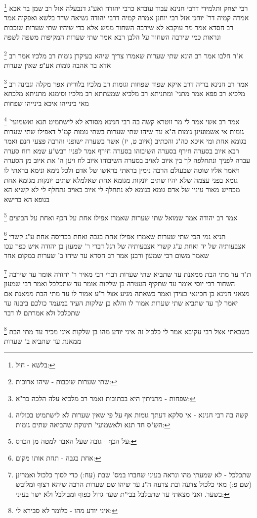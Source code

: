 \documentclass[12pt, openany]{book}
\newcommand{\footnotecomment}[1]{
	\renewcommand\thefootnote{}
	\footnote{#1}}
\newcommand{\commenta}[1]{\footnotecomment{#1}}
\begin{document}
{{\commenta{בלשא - חיל:}
רבי יצחק ותלמידי דרבי חנינא עבוד עובדא כרבי יהודה ואע"ג דנבעלה אזל רב שמן בר אבא אמרה קמיה דר' יוחנן אזל רבי יוחנן אמרה קמיה דרבי יהודה נשיאה שדר בלשא ואפקוה 
אמר רב חסדא אמר מר עוקבא לא שירבה השחור ממש אלא כדי שיהיו שתי שערות שוכבות ונראות כמי שירבה השחור על הלבן רבא אמר שתי שערות המקיפות משפה לשפה 
\commenta{שתי שערות שוכבות - שיהו ארוכות:}
א"ר חלבו אמר רב הונא שתי שערות שאמרו צריך שיהא בעיקרן גומות רב מלכיו אמר רב אדא בר אהבה גומות אע"פ שאין שערות 
\commenta{שפחות - מתניתין היא בכתובות ואמר רב מלכיא עלה הלכה כר"א:}
אמר רב חנינא בריה דרב איקא שפוד שפחות וגומות רב מלכיו בלורית אפר מקלה וגבינה רב מלכיא 
רב פפא אמר מתני' ומתניתא רב מלכיא שמעתתא רב מלכיו וסימנא מתניתא מלכתא 
מאי בינייהו איכא בינייהו שפחות 
\commenta{קשה בה רבי חנינא - אי סלקא דעתך גומות אף על פי שאין שערות לא לישתמיט בכוליה הש"ס חד תנא ולאשמועי' תינוקת שהביאה שתים גומות:}
אמר רב אשי אמר לי מר זוטרא קשה בה רבי חנינא מסורא לא לישתמיט תנא ואשמועי' גומות אי אשמועינן גומות ה"א עד שיהו שתי שערות בשתי גומות קמ"ל דאפילו שתי שערות בגומא אחת 
ומי איכא כה"ג והכתיב (איוב ט, יז) אשר בשערה ישופני והרבה פצעי חנם ואמר רבא איוב בסערה חירף בסערה השיבוהו בסערה חירף אמר לפניו רבש"ע שמא רוח סערה עברה לפניך ונתחלפה לך בין איוב לאויב בסערה השיבוהו {איוב לח } ויען ה' את
איוב מן הסערה ויאמר אליו שוטה שבעולם הרבה נימין בראתי בראשו של אדם ולכל נימא ונימא בראתי לו גומא בפני עצמה שלא יהיו שתים יונקות מגומא אחת שאלמלא שתים יונקות מגומא אחת מכחיש מאור עיניו של אדם גומא בגומא לא נתחלף לי איוב באויב נתחלף לי 
לא קשיא הא בגופא הא ברישא 
\commenta{על הכף - גובה שעל האבר למטה מן הכרס:}
אמר רב יהודה אמר שמואל שתי שערות שאמרו אפילו אחת על הכף ואחת על הביצים 
\commenta{אחת בגבה - תחת אותו מקום:}
תניא נמי הכי שתי שערות שאמרו אפילו אחת בגבה ואחת בכריסה אחת ע"ג קשרי אצבעותיה של יד ואחת ע"ג קשרי אצבעותיה של רגל דברי ר' שמעון בן יהודה איש כפר עכו שאמר משום רבי שמעון ורבנן אמר רב חסדא עד שיהו ב' שערות במקום אחד 
\commenta{שתכלכל - לא שמעתי מהו ונראה בעיני שחברו במס' שבת (עח:) כדי לסוך כלכול ואמרינן (שם פ:) מאי כלכול צדעה ובת צדעה ה"נ עד שיהו שם שערות הרבה שיהא רצוף ומלובש בשער. ואני מצאתי עד שתבלבל בבי"ת שער גדול כפוף ומבולבל ולא ישר בעיני:}
ת"ר עד מתי הבת ממאנת עד שתביא שתי שערות דברי רבי מאיר ר' יהודה אומר עד שירבה השחור רבי יוסי אומר עד שתקיף העטרה בן שלקות אומר עד שתכלכל 
ואמר רבי שמעון מצאני חנינא בן חכינאי בצידן ואמר כשאתה מגיע אצל ר"ע אמור לו עד מתי הבת ממאנת אם יאמר לך עד שתביא שתי שערות אמור לו והלא בן שלקות העיד במעמד כולכם ביבנה עד שתכלכל ולא אמרתם לו דבר 
\commenta{איני יודע מהו - כלומר לא סבירא לי:}
כשבאתי אצל רבי עקיבא אמר לי כלכול זה איני יודע מהו בן שלקות איני מכיר עד מתי הבת ממאנת עד שתביא ב' שערות
}}
\end{document}
